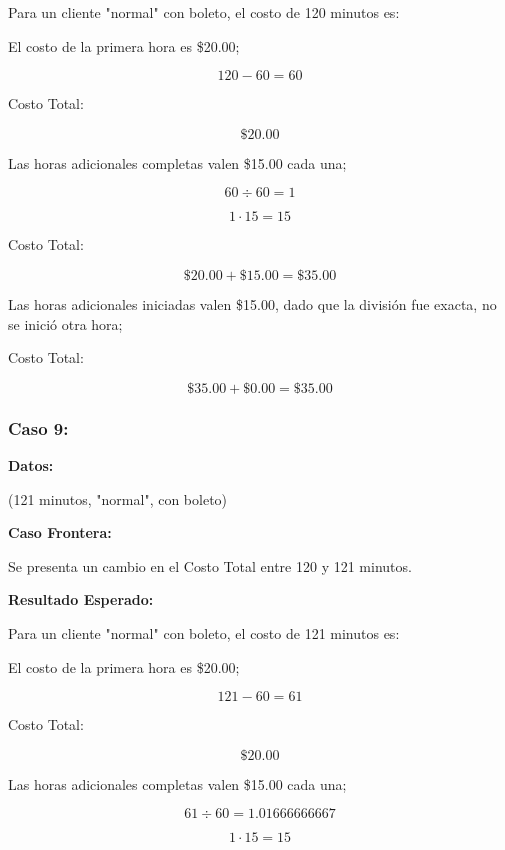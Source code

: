 \documentclass[11pt,letterpaper]{article}
\begin{document}
Para un cliente "normal" con boleto, el costo de 120 minutos es:

El costo de la primera hora es \$20.00;

\[
   120 - 60 = 60
\]



Costo Total:

\[
   \text{\$}20.00
\]

Las horas adicionales completas valen \$15.00 cada una;

\[
   60 \div 60 = 1
\]

\[
   1 \cdot 15 = 15
\]



Costo Total:

\[
   \text{\$}20.00 + \text{\$}15.00 = \text{\$}35.00
\]

Las horas adicionales iniciadas valen \$15.00, dado que la división fue exacta, no se inició otra hora;



Costo Total:

\[
   \text{\$}35.00 + \text{\$}0.00 = \text{\$}35.00
\]


\subsubsection{Caso 9:}
\label{sec:orgd5dfd69}

\textbf{Datos:}

(121 minutos, "normal", con boleto)

\textbf{Caso Frontera:}

Se presenta un cambio en el Costo Total entre 120 y 121 minutos.

\textbf{Resultado Esperado:}

Para un cliente "normal" con boleto, el costo de 121 minutos es:

El costo de la primera hora es \$20.00;

\[
   121 - 60 = 61
\]



Costo Total:

\[
   \text{\$}20.00
\]

Las horas adicionales completas valen \$15.00 cada una;

\[
   61 \div 60 = 1.01666666667
\]

\[
   1 \cdot 15 = 15
\]


\end{document}
